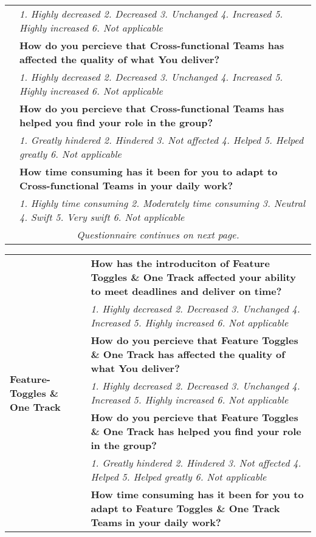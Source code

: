\documentclass[final_report_innit.tex]{subfiles}
\begin{document}
\begin{center}
\begin{tabular}[t]{| p{4.5cm} | p{13cm} |}
	& \textit{1. Highly decreased 2. Decreased 3. Unchanged 4. Increased 5. Highly increased 6. Not applicable} \\ \cline{2-2}
	& \cellcolor{greyOdd}\textbf{How do you percieve that Cross-functional Teams has affected the quality of what You deliver?} \\
	& \textit{1. Highly decreased 2. Decreased 3. Unchanged 4. Increased 5. Highly increased 6. Not applicable} \\ \cline{2-2}
	& \cellcolor{greyOdd}\textbf{How do you percieve that Cross-functional Teams has helped you find your role in the group?} \\
	& \textit{1. Greatly hindered 2. Hindered 3. Not affected 4. Helped 5. Helped greatly 6. Not applicable} \\ \cline{2-2}
	& \cellcolor{greyOdd}\textbf{How time consuming has it been for you to adapt to Cross-functional Teams in your daily work?} \\
	& \textit{1. Highly time consuming 2. Moderately time consuming 3. Neutral 4. Swift 5. Very swift 6. Not applicable} \\
	\hline
	\multicolumn{2}{c}{\textit{Questionnaire continues on next page.}}
\end{tabular}
\clearpage
\begin{tabular}[b]{| p{4.5cm} | p{13cm} |}
	\hline
	\multirow{16}{*}{\textbf{Feature-Toggles \& One Track}} & \cellcolor{greyOdd}\textbf{How has the introduciton of Feature Toggles \& One Track affected your ability to meet deadlines and deliver on time?} \\ 
	& \textit{1. Highly decreased 2. Decreased 3. Unchanged 4. Increased 5. Highly increased 6. Not applicable} \\ \cline{2-2}
	& \cellcolor{greyOdd}\textbf{How do you percieve that Feature Toggles \& One Track has affected the quality of what You deliver?} \\
	& \textit{1. Highly decreased 2. Decreased 3. Unchanged 4. Increased 5. Highly increased 6. Not applicable} \\ \cline{2-2}
	& \cellcolor{greyOdd}\textbf{How do you percieve that Feature Toggles \& One Track has helped you find your role in the group?} \\
	& \textit{1. Greatly hindered 2. Hindered 3. Not affected 4. Helped 5. Helped greatly 6. Not applicable} \\ \cline{2-2}
	& \cellcolor{greyOdd}\textbf{How time consuming has it been for you to adapt to Feature Toggles \& One Track Teams in your daily work?} \\

\end{tabular}
\end{center}
\end{document}
